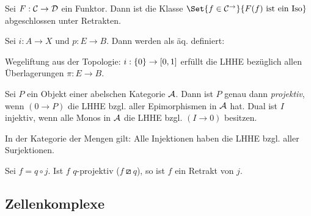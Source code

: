 \documentclass{cheat-sheet}
\newcommand{\lhhe}{\boxslash} %
\newenvironment{centertikzcd}
  {\begin{center}\begin{tikzcd}}
  {\end{tikzcd}\end{center}}
\begin{document}
\begin{prop}
  Sei $F : \mathcal{C} \to \mathcal{D}$ ein Funktor. Dann ist die Klasse $\Set{f \in \Cat^{\to}}{F(f) \text{ ist ein Iso}}$ abgeschlossen unter Retrakten.
\end{prop}

\begin{defn}
  Sei $i : A \to X$ und $p : E \to B$. Dann werden als äq. definiert:
\end{defn}

\begin{bsp}
  Wegeliftung aus der Topologie: $i : \{ 0 \} \to \left[ 0, 1 \right]$ erfüllt die LHHE bezüglich allen Überlagerungen $\pi : E \to B$.
\end{bsp}

\begin{bsp}
  Sei $P$ ein Objekt einer abelschen Kategorie $\mathcal{A}$. Dann ist $P$ genau dann \emph{projektiv}, wenn $(0 \to P)$ die LHHE bzgl. aller Epimorphismen in $\mathcal{A}$ hat.
  Dual ist $I$ injektiv, wenn alle Monos in $\mathcal{A}$ die LHHE bzgl. $(I \to 0)$ besitzen.
\end{bsp}

\begin{bsp}
  In der Kategorie der Mengen gilt: Alle Injektionen haben die LHHE bzgl. aller Surjektionen.
\end{bsp}

\begin{lem}
  Sei $f \!=\! q \circ j$. Ist $f$ $q$-projektiv ($f \lhhe q$), so ist $f$ ein Retrakt von $j$.
\end{lem}

\subsection{Zellenkomplexe}
\end{document}
